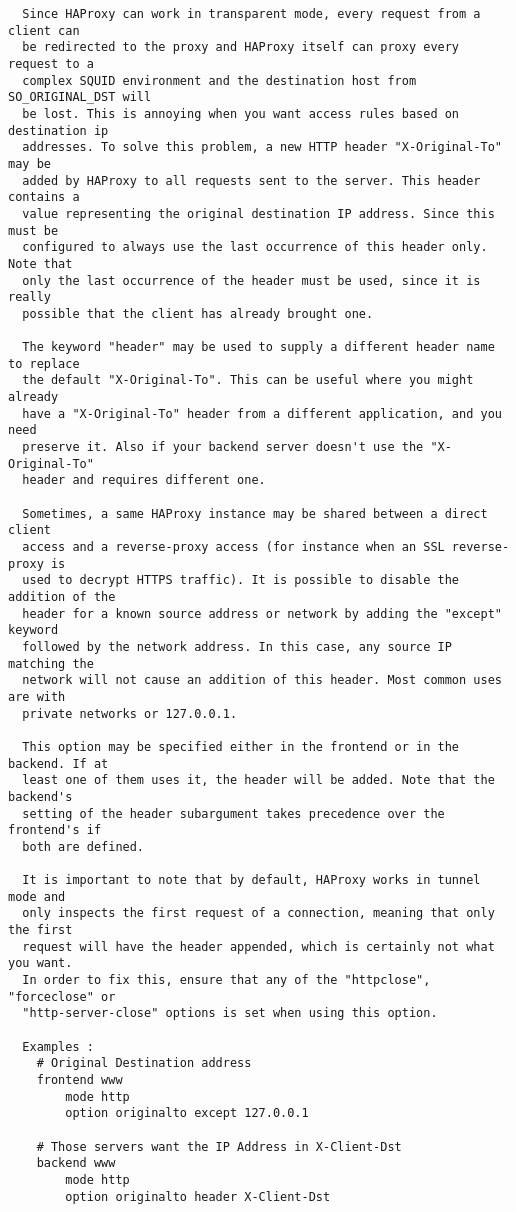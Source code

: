 \begin{verbatim}
  Since HAProxy can work in transparent mode, every request from a client can
  be redirected to the proxy and HAProxy itself can proxy every request to a
  complex SQUID environment and the destination host from SO_ORIGINAL_DST will
  be lost. This is annoying when you want access rules based on destination ip
  addresses. To solve this problem, a new HTTP header "X-Original-To" may be
  added by HAProxy to all requests sent to the server. This header contains a
  value representing the original destination IP address. Since this must be
  configured to always use the last occurrence of this header only. Note that
  only the last occurrence of the header must be used, since it is really
  possible that the client has already brought one.

  The keyword "header" may be used to supply a different header name to replace
  the default "X-Original-To". This can be useful where you might already
  have a "X-Original-To" header from a different application, and you need
  preserve it. Also if your backend server doesn't use the "X-Original-To"
  header and requires different one.

  Sometimes, a same HAProxy instance may be shared between a direct client
  access and a reverse-proxy access (for instance when an SSL reverse-proxy is
  used to decrypt HTTPS traffic). It is possible to disable the addition of the
  header for a known source address or network by adding the "except" keyword
  followed by the network address. In this case, any source IP matching the
  network will not cause an addition of this header. Most common uses are with
  private networks or 127.0.0.1.

  This option may be specified either in the frontend or in the backend. If at
  least one of them uses it, the header will be added. Note that the backend's
  setting of the header subargument takes precedence over the frontend's if
  both are defined.

  It is important to note that by default, HAProxy works in tunnel mode and
  only inspects the first request of a connection, meaning that only the first
  request will have the header appended, which is certainly not what you want.
  In order to fix this, ensure that any of the "httpclose", "forceclose" or
  "http-server-close" options is set when using this option.

  Examples :
    # Original Destination address
    frontend www
        mode http
        option originalto except 127.0.0.1

    # Those servers want the IP Address in X-Client-Dst
    backend www
        mode http
        option originalto header X-Client-Dst


\end{verbatim}
